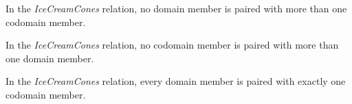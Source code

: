 \documentclass{ximera}
\begin{document}
\begin{exercise}
\begin{question} 
In the \textit{IceCreamCones} relation, no domain member is paired with more than one codomain member.

\begin{multipleChoice}
\end{multipleChoice}
\end{question}








\begin{question} 
In the \textit{IceCreamCones} relation, no codomain member is paired with more than one domain member.

\begin{multipleChoice}
\end{multipleChoice}
\end{question}








\begin{question} 
In the \textit{IceCreamCones} relation, every domain member is paired with exactly one codomain member.

\begin{multipleChoice}
\end{multipleChoice}
\end{question}







\end{exercise}
\end{document}
